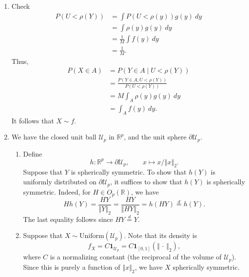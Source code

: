 \documentclass[11pt]{article}
\newcommand{\R}{\mathbb{R}}
\newcommand{\norm}[1]{\left\Vert #1 \right\Vert}
\begin{document}
\begin{enumerate}
        \item Check \begin{align*}
            P(U < \rho(Y))
                &= \int P(U < \rho(y)) g(y) \:dy \\
                &= \int \rho(y) g(y) \:dy \\
                &= \frac{1}{M} \int f(y) \:dy \\
                &= \frac{1}{M}.
        \end{align*}
        Thus, \begin{align*}
            P(X \in A)
                &= P(Y \in A \mid U < \rho(Y)) \\
                &= \frac{P(Y \in A, U < \rho(Y))}{P(U < \rho(Y))} \\
                &= M \int_A \rho(y) g(y) \:dy \\
                &= \int_A f(y) \:dy.
        \end{align*}
        It follows that $X \sim f$.


        \item We have the closed unit ball $\mathcal{U}_p$ in $\R^p$, and the
        unit sphere $\partial\mathcal{U}_p$.

        \begin{enumerate}
            \item Define \[
                h\colon \R^p \to \partial\mathcal{U}_p, \qquad
                x \mapsto x / \norm{x}_2.
            \] Suppose that $Y$ is spherically symmetric.
            To show that $h(Y)$ is uniformly distributed on
            $\partial\mathcal{U}_p$, it suffices to show that $h(Y)$ is
            spherically symmetric.
            Indeed, for $H \in O_p(\R)$, we have \[
                H h(Y)
                    = \frac{HY}{\norm{Y}_2}
                    = \frac{HY}{\norm{HY}_2}
                    = h(H Y)
                    \overset{d}{=} h(Y).
            \] The last equality follows since $HY \overset{d}{=} Y$.


            \item Suppose that $X \sim \text{Uniform}(\mathcal{U}_p)$.
            Note that its density is \[
                f_X
                    = C \bm{1}_{\mathcal{U}_p}
                    = C \bm{1}_{[0, 1]}(\norm{\,\cdot\,}_2),
            \] where $C$ is a normalizing constant (the reciprocal of the
            volume of $\mathcal{U}_p$).
            Since this is purely a function of $\norm{x}_2$, we have $X$
            spherically symmetric. \\


\end{enumerate}
\end{enumerate}
\end{document}
